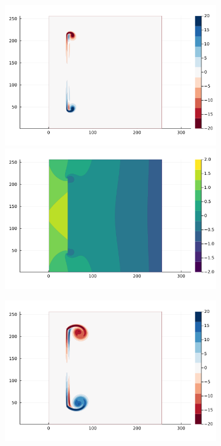 \documentclass{article}
\begin{document}
\begin{figure}
    \centering
    \begin{subfigure}{.33\textwidth}
        \centering
         \includegraphics[trim={4cm 7.2cm 5cm 1cm},clip,width=\textwidth]{tex/fig/Disk_biot_omega_1.png}
        \includegraphics[trim={4cm 1.5cm 5cm 7cm},clip,width=\textwidth]{tex/fig/Disk_biot_press_1.png}
    \end{subfigure}%
    \begin{subfigure}{.33\textwidth}
        \centering
        \includegraphics[trim={4cm 7.2cm 5cm 1cm},clip,width=\textwidth]{tex/fig/Disk_biot_omega_2.png}

\end{subfigure}
\end{figure}
\end{document}
